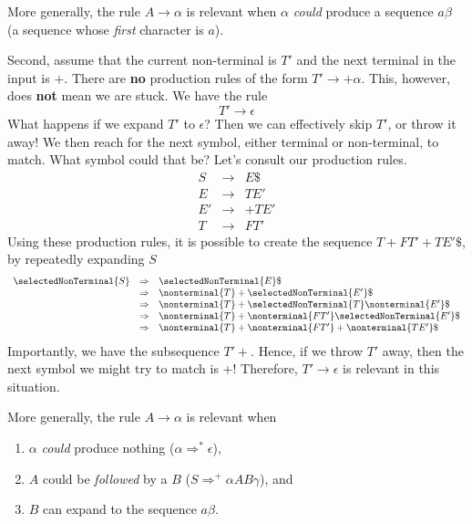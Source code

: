 More generally, the rule $A \to \alpha$ is relevant when $\alpha$ \textit{could} produce a sequence $a\beta$ (a sequence whose \textit{first} character is $a$). 

Second, assume that the current non-terminal is $T'$ and the next terminal in the input is $+$. There are \textbf{no} production rules of the form $T' \rightarrow +\alpha$. This, however, does \textbf{not} mean we are stuck. We have the rule
\[ T' \to \epsilon \]
What happens if we expand $T'$ to $\epsilon$? Then we can effectively skip $T'$, or throw it away! We then reach for the next symbol, either terminal or non-terminal, to match. What symbol could that be? Let's consult our production rules.
\[\begin{array}{rcl}
     S & \to & E\$ \\
     E & \to & TE' \\
     E' & \to & +TE'  \\
     T & \to & FT' 
\end{array}\]
Using these production rules, it is possible to create the sequence $T+FT'+TE'\$$, by repeatedly expanding $S$
\[\begin{array}{rcl}
     \selectedNonTerminal{S} &\Rightarrow&\selectedNonTerminal{E}\$\\
                             &\Rightarrow&\nonterminal{T}+\selectedNonTerminal{E'}\$\\
                             &\Rightarrow&\nonterminal{T}+\selectedNonTerminal{T}\nonterminal{E'}\$\\
                             &\Rightarrow&\nonterminal{T}+\nonterminal{FT'}\selectedNonTerminal{E'}\$\\
                             &\Rightarrow&\nonterminal{T}+\nonterminal{FT'}+\nonterminal{TE'}\$
\end{array}\]
Importantly, we have the subsequence $T' +$. Hence, if we throw $T'$ away, then the next symbol we might try to match is $+$! Therefore, $T' \to \epsilon$ is relevant in this situation. 

More generally, the rule $A \to \alpha$ is relevant when 
\begin{enumerate}
    \item $\alpha$ \textit{could} produce nothing ($\alpha \Rightarrow^* \epsilon$),
    \item $A$ could be \textit{followed} by a $B$ ($S \Rightarrow^+ \alpha AB \gamma$), and
    \item $B$ can expand to the sequence $a\beta$.
\end{enumerate}

